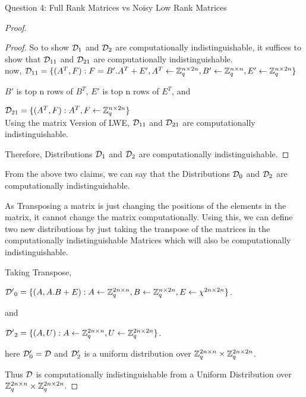 \begin{solution}{Question 4: Full Rank Matrices vs Noisy Low Rank Matrices}
\begin{proof}
\begin{proof}
         So to show $\mathcal{D}_1$ and $\mathcal{D}_2$ are computationally indistinguishable, it suffices to show that $\mathcal{D}_{11}$ and $\mathcal{D}_{21}$ are computationally indistinguishable.\\

         now, $\mathcal{D}_{11} = \{ (A^T,F): F = B' . A^T + E', A^T \leftarrow \mathbb{Z}_q^{n\times 2n}, B' \leftarrow \mathbb{Z}_q^{n\times n}, E' \leftarrow \mathbb{Z}_q^{n\times 2n}\}$

         $B'$ is top n rows of $B^T$, $E'$ is  top n rows of $E^T$, and 
         
         $\mathcal{D}_{21} = \{ (A^T,F):  A^T,F \leftarrow \mathbb{Z}_q^{n\times 2n} \}$\\

        Using the matrix Version of LWE, $\mathcal{D}_{11}$ and $\mathcal{D}_{21}$ are computationally indistinguishable.

        Therefore, Distributions $\mathcal{D}_1$ and $\mathcal{D}_2$ are computationally indistinguishable.
    \end{proof}


From the above two claims, we can say that the Distributions $\mathcal{D}_0$ and $\mathcal{D}_2$ are computationally indistinguishable.

As Transposing a matrix is just changing the positions of the elements in the matrix, it cannot change the matrix computationally. Using this, we can define two new distributions by just taking the transpose of the matrices in the computationally indistinguishable Matrices which will also be computationally indistinguishable.

Taking Transpose,

$\mathcal{D'}_0 = \{ (A,A.B +E) : A \leftarrow \mathbb{Z}_q^{2n\times n}, B \leftarrow \mathbb{Z}_q^{n\times 2n}, E \leftarrow \chi^{2n\times 2n} \}$.

and

$\mathcal{D'}_2 = \{ (A,U) : A \leftarrow \mathbb{Z}_q^{2n\times n}, U \leftarrow \mathbb{Z}_q^{2n\times 2n} \}$.

here $\mathcal{D}'_0 = \mathcal{D}$ and $\mathcal{D}'_2$ is a uniform distribution over $\mathbb{Z}_q^{2n\times n} \times \mathbb{Z}_q^{2n\times 2n}$.

Thus $\mathcal{D}$ is computationally indistinguishable from a Uniform Distribution over $\mathbb{Z}_q^{2n\times n} \times \mathbb{Z}_q^{2n\times 2n}$.
    \end{proof}
\end{solution}

